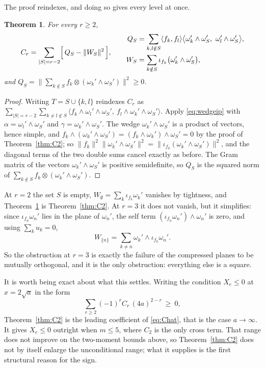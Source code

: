 \documentclass[11pt]{article}
\newtheorem{theorem}{Theorem}
\theoremstyle{remark}
\begin{document}
The proof reindexes, and doing so gives every level at once.

\begin{theorem}\label{thm:Cr}
For every $r\ge2$,
\[
C_r=\sum_{|S|=r-2}\Bigl[\,Q_S-\|W_S\|^2\,\Bigr],
\qquad
\begin{aligned}
Q_S&=\sum_{k,l\notin S}\langle f_k,f_l\rangle
\bigl\langle\omega_k'\wedge\omega_S',\ \omega_l'\wedge\omega_S'\bigr\rangle,\\
W_S&=\sum_{k\notin S}\iota_{f_k}\bigl(\omega_k'\wedge\omega_S'\bigr),
\end{aligned}
\]
and $Q_S=\bigl\|\sum_{k\notin S}f_k\otimes(\omega_k'\wedge\omega_S')\bigr\|^2\ge0$.
\end{theorem}

\begin{proof}
Writing $T=S\cup\{k,l\}$ reindexes $C_r$ as
$\sum_{|S|=r-2}\sum_{k\ne l\notin S}\langle f_k\wedge\omega_l'\wedge\omega_S',\
f_l\wedge\omega_k'\wedge\omega_S'\rangle$. Apply \eqref{eq:wedgeip} with
$\alpha=\omega_l'\wedge\omega_S'$ and $\gamma=\omega_k'\wedge\omega_S'$. The wedge
$\omega_k'\wedge\omega_S'$ is a product of vectors, hence simple, and
$f_k\wedge(\omega_k'\wedge\omega_S')=(f_k\wedge\omega_k')\wedge\omega_S'=0$ by the proof
of Theorem~\ref{thm:C2}; so
$\|f_k\|^2\|\omega_k'\wedge\omega_S'\|^2=\|\iota_{f_k}(\omega_k'\wedge\omega_S')\|^2$,
and the diagonal terms of the two double sums cancel exactly as before. The Gram matrix
of the vectors $\omega_k'\wedge\omega_S'$ is positive semidefinite, so $Q_S$ is the
squared norm of $\sum_{k\notin S}f_k\otimes(\omega_k'\wedge\omega_S')$.
\end{proof}

At $r=2$ the set $S$ is empty, $W_\emptyset=\sum_k\iota_{f_k}\omega_k'$ vanishes by
tightness, and Theorem~\ref{thm:Cr} is Theorem~\ref{thm:C2}. At $r=3$ it does not
vanish, but it simplifies: since $\iota_{f_n}\omega_n'$ lies in the plane of $\omega_n'$,
the self term $(\iota_{f_n}\omega_n')\wedge\omega_n'$ is zero, and using
$\sum_ku_k=0$,
\[
W_{\{n\}}=\sum_{k\ne n}\omega_k'\wedge\iota_{f_k}\omega_n' .
\]
So the obstruction at $r=3$ is exactly the failure of the compressed planes to be
mutually orthogonal, and it is the only obstruction: everything else is a square.

It is worth being exact about what this settles. Writing the condition $X_e\le0$ at
$x=2\sqrt a$ in the form
\begin{equation}\label{eq:Chat}
\sum_{r\ge2}(-1)^rC_r\,(4a)^{2-r}\ \ge\ 0 ,
\end{equation}
Theorem~\ref{thm:C2} is the leading coefficient of \eqref{eq:Chat}, that is the case
$a\to\infty$. It gives $X_e\le0$ outright when $m\le5$, where $C_2$ is the only cross
term. That range does not improve on the two-moment bounds above, so
Theorem~\ref{thm:C2} does not by itself enlarge the unconditional range; what it supplies
is the first structural reason for the sign.
\end{document}
